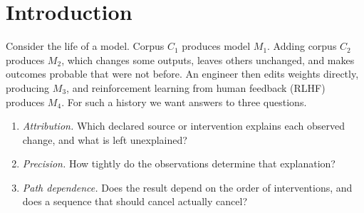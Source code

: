 \documentclass[11pt]{article}
\theoremstyle{definition}
\theoremstyle{remark}
\begin{document}
\begin{abstract}
1-cells differ. Their vertical composition is the gluing lemma and is strictly associative, but the
natural whiskerings are not functorial, and the strict 2-categorical structure is a graded metric
shadow. For several contexts, two compatible contexts always glue, and that gluing is vertical
composition of witnesses. For a general cover, the contextual fraction of Abramsky, Barbosa and
Mansfield equals our minimal unmodeled weight, and the best approximate global state is computed by a
linear program; for the Popescu--Rohrlich box it is exactly $1/4$ away from some context. Gluing at
the second level of the tower retains correlations that gluing flattened states loses. Finally, the
simplex of output distributions is a moment polytope whose Lagrangian fibres are what observation
forgets, and we state necessary conditions for a Fukaya-type realization; a companion theory paper has since
decided parts of two of them. A synthetic four-stage
experiment produces a full provenance report. Every theorem is checked in exact arithmetic or with exactly verified linear
programming certificates.
\end{abstract}

\tableofcontents

\section{Introduction}\label{sec:intro}

Consider the life of a model. Corpus $C_1$ produces model $M_1$. Adding corpus $C_2$ produces $M_2$,
which changes some outputs, leaves others unchanged, and makes outcomes probable that were not before.
An engineer then edits weights directly, producing $M_3$, and reinforcement learning from human
feedback (RLHF) produces $M_4$. For such a history we want answers to three questions.

\begin{enumerate}[label=(Q\arabic*),leftmargin=*]
\item \emph{Attribution.} Which declared source or intervention explains each observed change, and
  what is left unexplained?
\item \emph{Precision.} How tightly do the observations determine that explanation?
\item \emph{Path dependence.} Does the result depend on the order of interventions, and does a
  sequence that should cancel actually cancel?
\end{enumerate}
\end{document}
